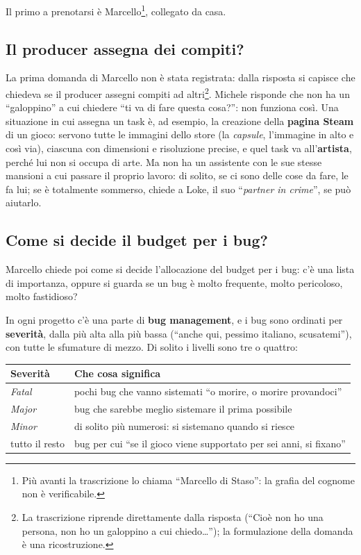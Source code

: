Il primo a prenotarsi è Marcello\footnote{Più avanti la trascrizione lo chiama
``Marcello di Staso'': la grafia del cognome non è verificabile.}, collegato da
casa.

\subsection{Il producer assegna dei compiti?}

La prima domanda di Marcello non è stata registrata: dalla risposta si capisce
che chiedeva se il producer assegni compiti ad altri\footnote{La trascrizione
riprende direttamente dalla risposta (``Cioè non ho una persona, non ho un
galoppino a cui chiedo\dots''); la formulazione della domanda è una
ricostruzione.}. Michele risponde che non ha un ``galoppino'' a cui chiedere
``ti va di fare questa cosa?'': non funziona così. Una situazione in cui assegna
un task è, ad esempio, la creazione della \textbf{pagina Steam} di un gioco:
servono tutte le immagini dello store (la \emph{capsule}, l'immagine in alto e
così via), ciascuna con dimensioni e risoluzione precise, e quel task va
all'\textbf{artista}, perché lui non si occupa di arte. Ma non ha un assistente
con le sue stesse mansioni a cui passare il proprio lavoro: di solito, se ci
sono delle cose da fare, le fa lui; se è totalmente sommerso, chiede a Loke, il
suo ``\emph{partner in crime}'', se può aiutarlo.

\subsection{Come si decide il budget per i bug?}

Marcello chiede poi come si decide l'allocazione del budget per i bug: c'è una
lista di importanza, oppure si guarda se un bug è molto frequente, molto
pericoloso, molto fastidioso?

In ogni progetto c'è una parte di \textbf{bug management}, e i bug sono ordinati
per \textbf{severità}, dalla più alta alla più bassa (``anche qui, pessimo
italiano, scusatemi''), con tutte le sfumature di mezzo. Di solito i livelli
sono tre o quattro:
\begin{center}
  \begin{tabular}{@{}lp{}@{}}
    \toprule
    \textbf{Severità} & \textbf{Che cosa significa} \\
    \midrule
    \emph{Fatal} & pochi bug che vanno sistemati ``o morire, o morire
    provandoci'' \\
    \emph{Major} & bug che sarebbe meglio sistemare il prima possibile \\
    \emph{Minor} & di solito più numerosi: si sistemano quando si riesce \\
    tutto il resto & bug per cui ``se il gioco viene supportato per sei anni,
    si fixano'' \\
    \bottomrule
  \end{tabular}
\end{center}

